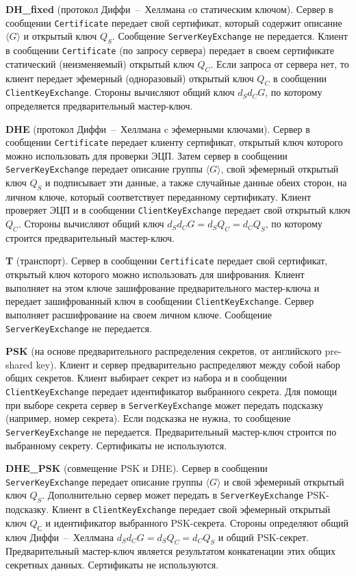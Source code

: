{\bf DH\_fixed} (протокол Диффи~--~Хеллмана cо статическим ключом). Сервер в 
сообщении \lstinline{Certificate} передает свой сертификат, который содержит 
описание $\langle G \rangle$ и открытый ключ $Q_{S}$. Сообщение 
\lstinline{ServerKeyExchange} не передается. Клиент в сообщении 
\lstinline{Certificate} (по запросу сервера) передает в своем сертификате 
статический (неизменяемый) открытый ключ $Q_{C}$. Если запроса от сервера 
нет, то клиент передает эфемерный (одноразовый) открытый ключ $Q_{C}$ в 
сообщении \lstinline{ClientKeyExchange}. Стороны вычисляют общий ключ 
$d_{S}d_{C}G$, по которому определяется предварительный мастер-ключ. 

{\bf DHE} (протокол Диффи~--~Хеллмана c эфемерными ключами). Сервер в 
сообщении \lstinline{Certificate} передает клиенту сертификат, открытый ключ 
которого можно использовать для проверки ЭЦП. Затем сервер в сообщении 
\lstinline{ServerKeyExchange} передает описание группы $\langle G \rangle$, 
свой эфемерный открытый ключ $Q_{S}$ и подписывает эти данные, а также 
случайные данные обеих сторон, на личном ключе, который соответствует 
переданному сертификату. Клиент проверяет ЭЦП и в сообщении 
\lstinline{ClientKeyExchange} передает свой открытый ключ $Q_{C}$. Стороны 
вычисляют общий ключ $d_{S}d_{C}G = d_{S}Q_{C} = d_{C}Q_{S}$, по которому 
строится предварительный мастер-ключ.  

{\bf T} (транспорт). Сервер в сообщении \lstinline{Certificate} передает свой 
сертификат, открытый ключ которого можно использовать для шифрования. 
Клиент выполняет на этом ключе зашифрование предварительного мастер-ключа 
и передает зашифрованный ключ в сообщении \lstinline{ClientKeyExchange}. 
Сервер выполняет расшифрование на своем личном ключе. Сообщение 
\lstinline{ServerKeyExchange} не передается. 

{\bf PSK} (на основе предварительного распределения секретов, от 
английского pre-shared key). Клиент и сервер предварительно распределяют 
между собой набор общих секретов. Клиент выбирает секрет из набора и в 
сообщении \lstinline{ClientKeyExchange} передает идентификатор выбранного 
секрета. Для помощи при выборе секрета сервер в 
\lstinline{ServerKeyExchange} может передать подсказку (например, номер 
секрета). Если подсказка не нужна, то сообщение 
\lstinline{ServerKeyExchange} не передается. Предварительный мастер-ключ 
строится по выбранному секрету. Сертификаты не используются.  

{\bf DHE\_PSK} (совмещение PSK и DHE). Сервер в сообщении 
\lstinline{ServerKeyExchange} передает описание группы $\langle G \rangle$ и 
свой эфемерный открытый ключ $Q_{S}$. Дополнительно сервер может передать 
в \lstinline{ServerKeyExchange} PSK-подсказку. Клиент в 
\lstinline{ClientKeyExchange} передает свой эфемерный открытый ключ $Q_{С}$ и 
идентификатор выбранного PSK-секрета. Стороны определяют общий ключ 
Диффи~--~Хеллмана $d_{S}d_{C}G = d_{S}Q_{C} = d_{C}Q_{S}$ и общий PSK-секрет. 
Предварительный мастер-ключ является результатом конкатенации этих общих 
секретных данных. Сертификаты не используются. 

